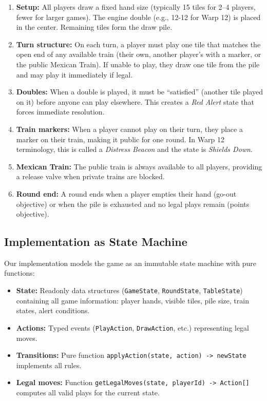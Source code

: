 \documentclass[11pt,letterpaper]{article}
\begin{document}
\begin{enumerate}
\item \textbf{Setup:} All players draw a fixed hand size (typically 15 tiles for 2--4 players, fewer for larger games). The engine double (e.g., 12-12 for Warp 12) is placed in the center. Remaining tiles form the draw pile.

\item \textbf{Turn structure:} On each turn, a player must play one tile that matches the open end of any available train (their own, another player's with a marker, or the public Mexican Train). If unable to play, they draw one tile from the pile and may play it immediately if legal.

\item \textbf{Doubles:} When a double is played, it must be ``satisfied'' (another tile played on it) before anyone can play elsewhere. This creates a \textit{Red Alert} state that forces immediate resolution.

\item \textbf{Train markers:} When a player cannot play on their turn, they place a marker on their train, making it public for one round. In Warp 12 terminology, this is called a \textit{Distress Beacon} and the state is \textit{Shields Down}.

\item \textbf{Mexican Train:} The public train is always available to all players, providing a release valve when private trains are blocked.

\item \textbf{Round end:} A round ends when a player empties their hand (go-out objective) or when the pile is exhausted and no legal plays remain (points objective).
\end{enumerate}

\subsection{Implementation as State Machine}

Our implementation models the game as an immutable state machine with pure functions:

\begin{itemize}
\item \textbf{State:} Readonly data structures (\texttt{GameState}, \texttt{RoundState}, \texttt{TableState}) containing all game information: player hands, visible tiles, pile size, train states, alert conditions.

\item \textbf{Actions:} Typed events (\texttt{PlayAction}, \texttt{DrawAction}, etc.) representing legal moves.

\item \textbf{Transitions:} Pure function \texttt{applyAction(state, action) -> newState} implements all rules.

\item \textbf{Legal moves:} Function \texttt{getLegalMoves(state, playerId) -> Action[]} computes all valid plays for the current state.
\end{itemize}
\end{document}
